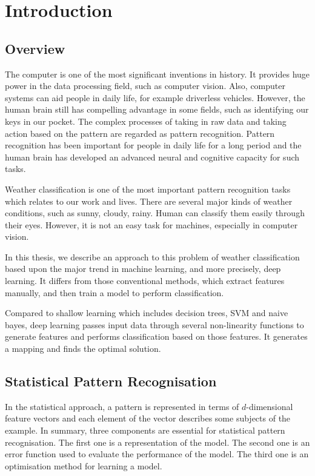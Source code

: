 \chapter{Introduction} %
\label{Chapter1}


\section{Overview}

The computer is one of the most significant inventions in history. It provides huge power in the data processing field, such as computer vision. Also, computer systems can aid people in daily life, for example driverless vehicles. However, the human brain still has compelling advantage in some fields, such as identifying our keys in our pocket. The complex processes of taking in raw data and taking action based on the pattern are regarded as pattern recognition. Pattern recognition has been important for people in daily life for a long period and the human brain has developed an advanced neural and cognitive capacity for such tasks.

Weather classification is one of the most important pattern recognition tasks which relates to our work and lives. There are several major kinds of weather conditions, such as sunny, cloudy, rainy. Human can classify them easily through their eyes. However, it is not an easy task for machines, especially in computer vision. 

In this thesis, we describe an approach to this problem of weather classification based upon the major trend in machine learning, and more precisely, deep learning. It differs from those conventional methods, which extract features manually, and then train a model to perform classification.

Compared to shallow learning which includes decision trees, SVM and naive bayes, deep learning passes input data through several non-linearity functions to generate features and performs classification based on those features. It generates a mapping and finds the optimal solution.

\section{Statistical Pattern Recognisation}

In the statistical approach, a pattern is represented in terms of $d$-dimensional feature vectors and each element of the vector describes some subjects of the example. In summary, three components are essential for statistical pattern recognisation. The first one is a representation of the model. The second one is an error function used to evaluate the performance of the model. The third one is an optimisation method for learning a model.

